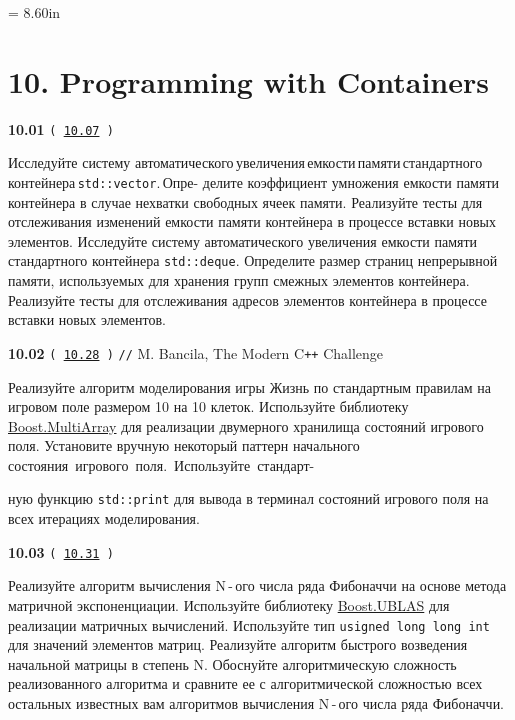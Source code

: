 \documentclass[a4paper,12pt]{article}
\begin{document}
\newpage\thispagestyle{empty}\pdfpageheight = 8.60in\enlargethispage{100in}

\section{10. Programming with Containers}

{\large \textbf{10.01} \texttt{(\,\href{https://github.com/i-s-m-mipt/Education/blob/master/projects/examples/source/10.07.cpp}{10.07}\,)}}

\bigskip

Исследуйте систему автоматического\,увеличения\,емкости\,памяти\,стандартного\,контейнера\,\lstinline{std::vector}.\,Опре- делите коэффициент умножения емкости памяти контейнера в случае нехватки свободных ячеек памяти. Реализуйте тесты для отслеживания изменений емкости памяти контейнера в процессе вставки новых элементов. Исследуйте систему автоматического увеличения емкости памяти стандартного контейнера \lstinline{std::deque}. Определите размер страниц непрерывной памяти, используемых для хранения групп смежных элементов контейнера. Реализуйте тесты для отслеживания адресов элементов контейнера в процессе вставки новых элементов.

\bigskip

{\large \textbf{10.02} \texttt{(\,\href{https://github.com/i-s-m-mipt/Education/blob/master/projects/examples/source/10.28.cpp}{10.28}\,)} \texttt{//} M. Bancila, The Modern C\texttt{++} Challenge}

\bigskip

Реализуйте алгоритм моделирования игры Жизнь по стандартным правилам на игровом поле размером 10 на 10 клеток. Используйте библиотеку \href{https://www.boost.org/doc/libs/latest/libs/multi_array/doc/user.html}{Boost.MultiArray} для реализации двумерного хранилища состояний игрового поля. Установите вручную некоторый паттерн начального состояния~игрового~поля.~Используйте~стандарт- 

ную функцию \lstinline{std::print} для вывода в терминал состояний игрового поля на всех итерациях моделирования.

\bigskip

{\large \textbf{10.03} \texttt{(\,\href{https://github.com/i-s-m-mipt/Education/blob/master/projects/examples/source/10.31.cpp}{10.31}\,)}}

\bigskip

Реализуйте алгоритм вычисления N\,-\,ого числа ряда Фибоначчи на основе метода матричной экспоненциации. Используйте библиотеку \href{https://www.boost.org/doc/libs/latest/libs/numeric/ublas/doc/}{Boost.UBLAS} для реализации матричных вычислений. Используйте тип \lstinline{usigned long long int} для значений элементов матриц. Реализуйте алгоритм быстрого возведения начальной матрицы в степень N. Обоснуйте алгоритмическую сложность реализованного алгоритма и сравните ее с алгоритмической сложностью всех остальных известных вам алгоритмов вычисления N\,-\,ого числа ряда Фибоначчи.
\end{document}
